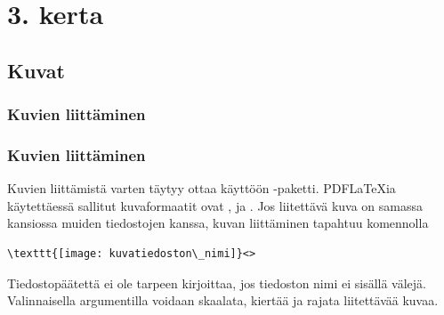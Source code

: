 \begin{frame}[fragile]
    
\end{frame}



\section{3. kerta}


\subsection{Kuvat}

\subsubsection{Kuvien liittäminen}
\begin{frame}[fragile]
    \frametitle{Kuvien liittäminen}
    Kuvien liittämistä varten täytyy ottaa käyttöön -paketti. 
    \vaihto
    PDFLaTeXia käytettäessä sallitut kuvaformaatit ovat ,  ja . 
    \vaihto
    Jos liitettävä kuva on samassa kansiossa muiden tiedostojen kanssa, kuvan liittäminen tapahtuu komennolla
    \begin{lstlisting}
\texttt{[image: kuvatiedoston\_nimi]}<>
    \end{lstlisting}
    Tiedostopäätettä ei ole tarpeen kirjoittaa, jos tiedoston nimi ei sisällä välejä.
    \vaihto
    Valinnaisella argumentilla voidaan skaalata, kiertää ja rajata liitettävää kuvaa. 
\end{frame}

